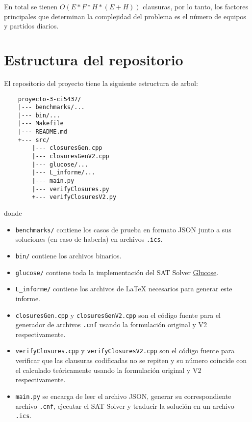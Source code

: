 \documentclass[a4paper,10pt]{article}
\begin{document}
    En total se tienen $O(E * F * H * (E + H))$ clausuras, por lo tanto, los factores
    principales que determinan la complejidad del problema es el n\'umero de equipos 
    y partidos diarios.

  
\section{Estructura del repositorio}
  El repositorio del proyecto tiene la siguiente estructura de arbol:

  \begin{verbatim}
    proyecto-3-ci5437/
    |--- benchmarks/...
    |--- bin/...
    |--- Makefile
    |--- README.md
    +--- src/
        |--- closuresGen.cpp
        |--- closuresGenV2.cpp
        |--- glucose/...
        |--- L_informe/...
        |--- main.py
        |--- verifyClosures.py
        +--- verifyClosuresV2.py
  \end{verbatim}

  \noindent
  donde 

  \begin{itemize}
    \item \verb|benchmarks/| contiene los casos de prueba en formato JSON junto
    a sus soluciones (en caso de haberla) en archivos \verb|.ics|.

    \item \verb|bin/| contiene los archivos binarios.
    
    \item \verb|glucose/| contiene toda la implementaci\'on del SAT Solver 
    \href{https://www.labri.fr/perso/lsimon/glucose/}{Glucose}.

    \item \verb|L_informe/| contiene los archivos de \LaTeX \hspace{0.075cm} 
    necesarios para generar este informe.

    \item \verb|closuresGen.cpp| y \verb|closuresGenV2.cpp| son el c\'odigo 
    fuente para el generador de archivos \verb|.cnf| usando la formulaci\'on 
    original y V2 respectivamente.

    \item \verb|verifyClosures.cpp| y \verb|verifyClosuresV2.cpp| son el c\'odigo 
    fuente para verificar que las clausuras codificadas no se repiten y su n\'umero 
    coincide con el calculado te\'oricamente usando la formulaci\'on original 
    y V2 respectivamente.

    \item \verb|main.py| se encarga de leer el archivo JSON, generar su correspondiente
    archivo \verb|.cnf|, ejecutar el SAT Solver y traducir la soluci\'on en un 
    archivo \verb|.ics|.
  \end{itemize}
\end{document}
